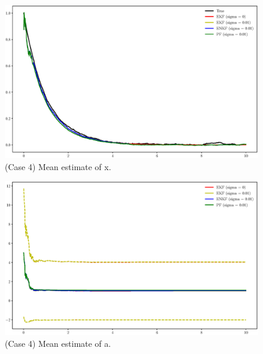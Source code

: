 \documentclass[]{elsarticle}
\begin{document}
\begin{figure}[!htb]
\centering
\includegraphics[width=\linewidth,keepaspectratio]{./figs/case00_x_estimate5.eps}
\caption{(Case 4) Mean estimate of x.}
\label{fig:x5}
\end{figure}

\begin{figure}[!htb]
\centering
\includegraphics[width=\linewidth,keepaspectratio]{./figs/case00_a_estimate5.eps}
\caption{(Case 4) Mean estimate of a.}
\label{fig:a5}
\end{figure}
\end{document}
